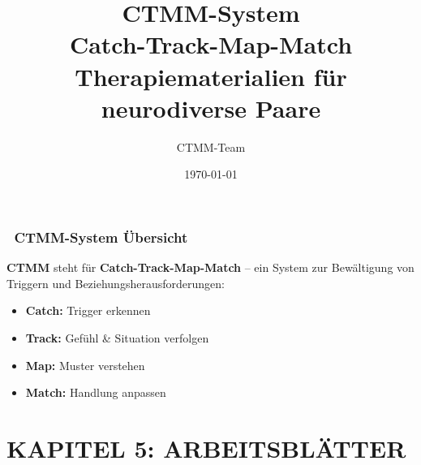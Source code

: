 \documentclass[a4paper,12pt]{article}
\begin{document}
\title{%
  {\Huge\textcolor{ctmmBlue}{CTMM-System}}\\
  \vspace{0.5cm}
  {\Large\textcolor{ctmmOrange}{Catch-Track-Map-Match}}\\
  \vspace{0.5cm}
  {\normalsize\textcolor{ctmmGreen}{Therapiematerialien für neurodiverse Paare}}
}
\author{CTMM-Team}
\date{\today}
\maketitle

\tableofcontents
\newpage

\section*{\texorpdfstring{\textcolor{ctmmBlue}{\faCompass~CTMM-System Übersicht}}{CTMM-System Übersicht}}

\begin{ctmmBlueBox}[title=Was ist CTMM?]
\textbf{CTMM} steht für \textbf{Catch-Track-Map-Match} -- ein System zur Bewältigung von Triggern und Beziehungsherausforderungen:

\begin{itemize}
    \item \textcolor{ctmmBlue}{\textbf{Catch:}} Trigger erkennen
    \item \textcolor{ctmmGreen}{\textbf{Track:}} Gefühl \& Situation verfolgen  
    \item \textcolor{ctmmOrange}{\textbf{Map:}} Muster verstehen
    \item \textcolor{ctmmPurple}{\textbf{Match:}} Handlung anpassen
\end{itemize}
\end{ctmmBlueBox}
















\newpage
\part*{KAPITEL 5: ARBEITSBLÄTTER}











\end{document}
